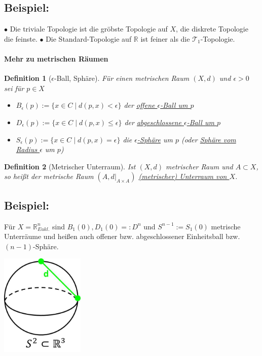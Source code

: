 \documentclass[a4paper,11pt,notitlepage]{report}
\newtheorem{definition}{Definition}[chapter]
\newcommand{\R}{{\ensuremath{\mathbb{R}}}}
\newenvironment{bsp}[1]
{
\setlength{\fboxsep}{10pt}
\subsection*{Beispiel: #1}
\begin{upshape}
}
{
\end{upshape}
}
\begin{document}
\begin{bsp}{}
	$\bullet$ Die triviale Topologie ist die gröbste Topologie auf $X$, die diskrete Topologie die feinste.
	\newline
	$\bullet$ Die Standard-Topologie auf $\R$ ist feiner als die $\mathcal{T}_1$-Topologie.
\end{bsp}

\newpage
\paragraph{Mehr zu metrischen Räumen}

\begin{definition}[$\epsilon$-Ball, Sphäre]
	Für einen metrischen Raum $(X,d)$ und $\epsilon > 0$ sei für $p \in X$
	\begin{itemize}
		\item $B_\epsilon(p):=\{x \in C \mid d(p,x) < \epsilon \}$ der \underline{offene $\epsilon$-Ball um $p$}
		\item $D_\epsilon(p):=\{x \in C \mid d(p,x) \leq \epsilon \}$ der \underline{abgeschlossene $\epsilon$-Ball um $p$}
		\item $S_\epsilon(p):=\{x \in C \mid d(p,x) = \epsilon \}$ die \underline{ $\epsilon$-Sphäre} um $p$ (oder \underline{Sphäre vom Radius $\epsilon$} um $p$)
	\end{itemize}
\end{definition}

\begin{definition}[Metrischer Unterraum]
	Ist $(X,d)$ metrischer Raum und $A \subset X$, so heißt der metrische Raum $(A, d \big |_{A \times A})$ \underline{(metrischer) Unterraum von $X$}.
\end{definition}

\begin{bsp}{}
	Für $X=\R_{Eukl.}^{n}$ sind $B_1(0), D_1(0) =: D^n$ und $S^{n-1}:=S_1(0)$ metrische Unterräume und heißen auch offener bzw. abgeschlossener Einheitsball bzw. $(n-1)$-Sphäre.
	\newline
	\begin{center}
	\includegraphics[width=0.3\textwidth]{images/metrischer_unterraum.jpg}
	\end{center}
\end{bsp}
\end{document}
